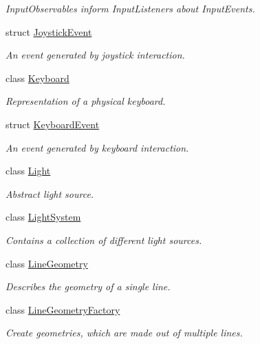 \begin{DoxyCompactItemize}
\begin{DoxyCompactList}\small\item\em Input\+Observables inform Input\+Listeners about Input\+Events. \end{DoxyCompactList}\item 
struct \mbox{\hyperlink{structec_1_1_joystick_event}{Joystick\+Event}}
\begin{DoxyCompactList}\small\item\em An event generated by joystick interaction. \end{DoxyCompactList}\item 
class \mbox{\hyperlink{classec_1_1_keyboard}{Keyboard}}
\begin{DoxyCompactList}\small\item\em Representation of a physical keyboard. \end{DoxyCompactList}\item 
struct \mbox{\hyperlink{structec_1_1_keyboard_event}{Keyboard\+Event}}
\begin{DoxyCompactList}\small\item\em An event generated by keyboard interaction. \end{DoxyCompactList}\item 
class \mbox{\hyperlink{classec_1_1_light}{Light}}
\begin{DoxyCompactList}\small\item\em Abstract light source. \end{DoxyCompactList}\item 
class \mbox{\hyperlink{classec_1_1_light_system}{Light\+System}}
\begin{DoxyCompactList}\small\item\em Contains a collection of different light sources. \end{DoxyCompactList}\item 
class \mbox{\hyperlink{classec_1_1_line_geometry}{Line\+Geometry}}
\begin{DoxyCompactList}\small\item\em Describes the geometry of a single line. \end{DoxyCompactList}\item 
class \mbox{\hyperlink{classec_1_1_line_geometry_factory}{Line\+Geometry\+Factory}}
\begin{DoxyCompactList}\small\item\em Create geometries, which are made out of multiple lines. \end{DoxyCompactList}\item 

\end{DoxyCompactItemize}
